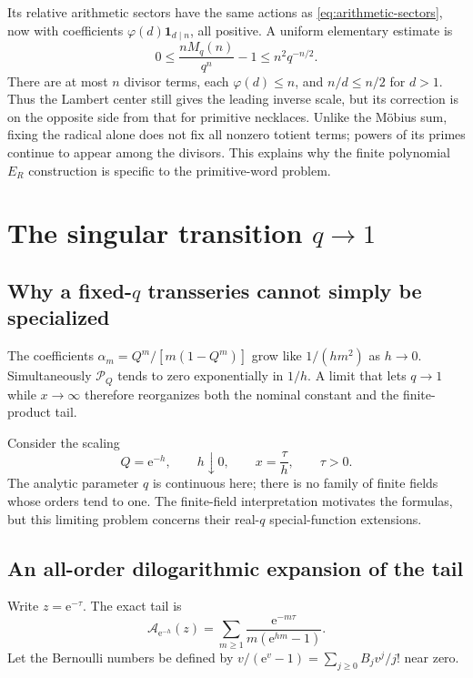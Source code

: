 \documentclass[11pt]{article}
\numberwithin{equation}{section}
\theoremstyle{definition}
\newcommand{\Pinf}{\mathcal P_Q}
\newcommand{\ee}{\mathrm e}
\newcommand{\one}{\mathbf 1}
\begin{document}
Its relative arithmetic sectors have the same actions as \eqref{eq:arithmetic-sectors}, now with coefficients $\varphi(d)\one_{d\mid n}$, all positive. A uniform elementary estimate is
\[
 0\le\frac{nM_q(n)}{q^n}-1
 \le n^2q^{-n/2}.
\]
There are at most $n$ divisor terms, each $\varphi(d)\le n$, and $n/d\le n/2$ for $d>1$. Thus the Lambert center still gives the leading inverse scale, but its correction is on the opposite side from that for primitive necklaces. Unlike the M\"obius sum, fixing the radical alone does not fix all nonzero totient terms; powers of its primes continue to appear among the divisors. This explains why the finite polynomial $E_R$ construction is specific to the primitive-word problem.

\section{The singular transition \texorpdfstring{$q\to1$}{q to 1}}
\label{sec:double}

\subsection{Why a fixed-\texorpdfstring{$q$}{q} transseries cannot simply be specialized}

The coefficients $\alpha_m=Q^m/[m(1-Q^m)]$ grow like $1/(hm^2)$ as $h\to0$. Simultaneously $\Pinf$ tends to zero exponentially in $1/h$. A limit that lets $q\to1$ while $x\to\infty$ therefore reorganizes both the nominal constant and the finite-product tail.

Consider the scaling
\begin{equation}\label{eq:double-scaling}
 Q=\ee^{-h},\qquad h\downarrow0,\qquad x=\frac\tau h,
 \qquad \tau>0.
\end{equation}
The analytic parameter $q$ is continuous here; there is no family of finite fields whose orders tend to one. The finite-field interpretation motivates the formulas, but this limiting problem concerns their real-$q$ special-function extensions.

\subsection{An all-order dilogarithmic expansion of the tail}

Write $z=\ee^{-\tau}$. The exact tail is
\begin{equation}\label{eq:double-Aexact}
 \mathcal A_{\ee^{-h}}(z)
 =\sum_{m\ge1}\frac{\ee^{-m\tau}}{m(\ee^{hm}-1)}.
\end{equation}
Let the Bernoulli numbers be defined by
$v/(\ee^v-1)=\sum_{j\ge0}B_jv^j/j!$ near zero.
\end{document}

